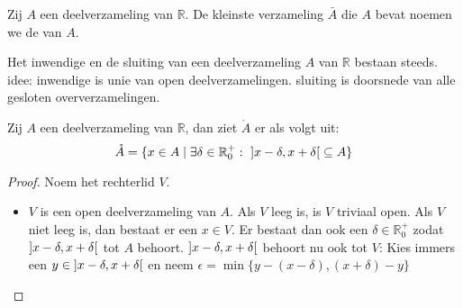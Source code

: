 \documentclass[main.tex]{subfiles}
\begin{document}
\begin{de}
  Zij $A$ een deelverzameling van $\mathbb{R}$.
  De kleinste verzameling $\bar{A}$ die $A$ bevat noemen we de  van $A$.
\end{de}

\begin{st}
  Het inwendige en de sluiting van een deelverzameling $A$ van $\mathbb{R}$ bestaan steeds.
  idee: inwendige is unie van open deelverzamelingen.
  sluiting is doorsnede van alle gesloten oververzamelingen.
\end{st}

\begin{pr}
  Zij $A$ een deelverzameling van $\mathbb{R}$, dan ziet $\mathring{A}$ er als volgt uit:
  \[ \mathring{A} = \{ x\in A\mid \exists \delta \in \mathbb{R}_{0}^{+}:\ \interval[open]{x-\delta}{x+\delta} \subseteq A \} \]

  \begin{proof}
    Noem het rechterlid $V$.
    \begin{itemize}
    \item $V$ is een open deelverzameling van $A$.
      Als $V$ leeg is, is $V$ triviaal open.
      Als $V$ niet leeg is, dan bestaat er een $x\in V$.
      Er bestaat dan ook een $\delta \in \mathbb{R}_{0}^{+}$ zodat $\interval[open]{x-\delta}{x+\delta}$ tot $A$ behoort.
      $\interval[open]{x-\delta}{x+\delta}$ behoort nu ook tot $V$:
      Kies immers een $y\in \interval[open]{x-\delta}{x+\delta}$ en neem $\epsilon = \min\{y-(x-\delta),(x+\delta)-y\}$
      \begin{figure}[H]
        \centering
\end{figure}
\end{itemize}
\end{proof}
\end{pr}
\end{document}
